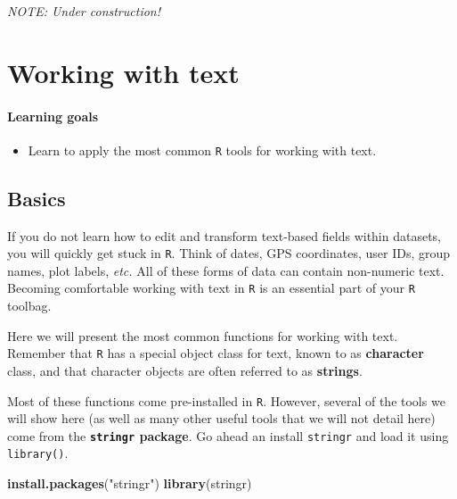 \documentclass[
]{book}
\newenvironment{Shaded}{\begin{snugshade}}{\end{snugshade}}
\newcommand{\KeywordTok}[1]{\textcolor[rgb]{0.13,0.29,0.53}{\textbf{#1}}}
\newcommand{\NormalTok}[1]{#1}
\newcommand{\StringTok}[1]{\textcolor[rgb]{0.31,0.60,0.02}{#1}}
\providecommand{\tightlist}{%
  \setlength{\itemsep}{0pt}\setlength{\parskip}{0pt}}
\begin{document}
\emph{NOTE: Under construction!}

\hypertarget{working-with-text}{%
\chapter{Working with text}\label{working-with-text}}

\hypertarget{learning-goals-15}{%
\subsubsection*{Learning goals}\label{learning-goals-15}}

\begin{itemize}
\tightlist
\item
  Learn to apply the most common \texttt{R} tools for working with text.
\end{itemize}

\hypertarget{basics-2}{%
\section*{Basics}\label{basics-2}}

If you do not learn how to edit and transform text-based fields within datasets, you will quickly get stuck in \texttt{R}. Think of dates, GPS coordinates, user IDs, group names, plot labels, \emph{etc.} All of these forms of data can contain non-numeric text. Becoming comfortable working with text in \texttt{R} is an essential part of your \texttt{R} toolbag.

Here we will present the most common functions for working with text. Remember that \texttt{R} has a special object class for text, known to as \textbf{character} class, and that character objects are often referred to as \textbf{strings}.

Most of these functions come pre-installed in \texttt{R}. However, several of the tools we will show here (as well as many other useful tools that we will not detail here) come from the \textbf{\texttt{stringr} package}. Go ahead an install \texttt{stringr} and load it using \texttt{library()}.

\begin{Shaded}
\begin{Highlighting}[]
\KeywordTok{install.packages}\NormalTok{(}\StringTok{"stringr"}\NormalTok{)}
\KeywordTok{library}\NormalTok{(stringr)}
\end{Highlighting}
\end{Shaded}
\end{document}
